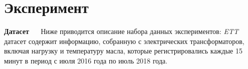 \section{Эксперимент}


\textbf{Датасет} $\quad$ Ниже приводится описание
набора данных экспериментов: \textit{ETT}~\cite{informer} датасет 
содержит информацию, собранную с электрических трансформаторов, 
включая нагрузку и температуру масла, которые регистрировались каждые 
15 минут в период с июля 2016 года по июль 2018 года. 


